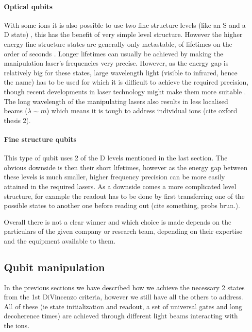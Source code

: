 \paragraph{Optical qubits}
With some ions it is also possible to use two fine structure levels (like an S and a D state) , this has the benefit of very simple level structure.
However the higher energy fine structure states are generally only metastable, of lifetimes on the order of seconds \cite{ozeriTrappedionQubitTool2011}.
Longer lifetimes can usually be achieved by making the manipulation laser's frequencies very precise.
However, as the energy gap is relatively big for these states, large wavelength light (visible to infrared, hence the name) has to be used for which it is difficult to achieve the required precision, though recent developments in laser technology might make them more suitable \cite{bruzewiczTrappedionQuantumComputing2019}.
The long wavelength of the manipulating lasers also results in less localised beams ($\lambda \sim \si{m}$) which means it is tough to address individual ions (cite oxford thesis 2).

\paragraph{Fine structure qubits}
This type of qubit uses 2 of the D levels mentioned in the last section.
The obvious downside is then their short lifetimes, however as the energy gap between these levels is much smaller, higher frequency precision can be more easily attained in the required lasers.
As a downside comes a more complicated level structure, for example the readout has to be done by first transferring one of the possible states to another one before reading out (cite something, probs brun.).


Overall there is not a clear winner and which choice is made depends on the particulars of the given company or research team, depending on their expertise and the equipment available to them.


\subsection{Qubit manipulation}\label{sec:TIQC_qbmanipulation}
In the previous sections we have described how we achieve the necessary 2 states from the 1st DiVincenzo criteria, however we still have all the others to address.
All of these (ie state initialization and readout, a set of universal gates and long decoherence times) are achieved through different light beams interacting with the ions.

